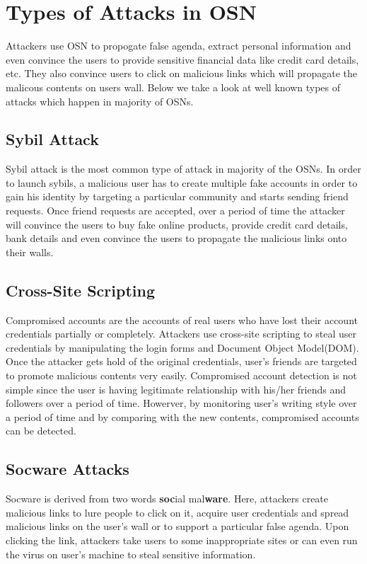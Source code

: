 \documentclass[conference]{IEEEtran}
\begin{document}
\section{Types of Attacks in OSN}
Attackers use OSN to propogate false agenda, extract personal information and even convince the users to provide sensitive financial data like credit card details, etc. They also convince users to click on malicious links which will propagate the malicous contents on users wall. Below we take a look at well known types of attacks which happen in majority of OSNs.

\subsection{Sybil Attack}
Sybil attack is the most common type of attack in majority of the OSNs. In order to launch sybils, a malicious user has to create multiple fake accounts in order to gain his identity by targeting a particular community and starts sending friend requests. Once friend requests are accepted, over a period of time the attacker will convince the users to buy fake online products, provide credit card details, bank details and even convince the users to propagate the malicious links onto their walls.

\subsection{Cross-Site Scripting}
Compromised accounts are the accounts of real users who have lost their account credentials partially or completely. Attackers use cross-site scripting to steal user credentials by manipulating the login forms and Document Object Model(DOM). Once the attacker gets hold of the original credentials, user's friends are targeted to promote malicious contents very easily. Compromised account detection is not simple since the user is having legitimate relationship with his/her friends and followers over a period of time. Howerver, by monitoring user's writing style over a period of time and by comparing with the new contents, compromised accounts can be detected.

\subsection{Socware Attacks}
Socware is derived from two words \textbf{soc}ial mal\textbf{ware}. Here, attackers create malicious links to lure people to click on it, acquire user credentials and spread malicious links on the user's wall or to support a particular false agenda. Upon clicking the link, attackers take users to some inappropriate sites or can even run the virus on user's machine to steal sensitive information.
\end{document}
